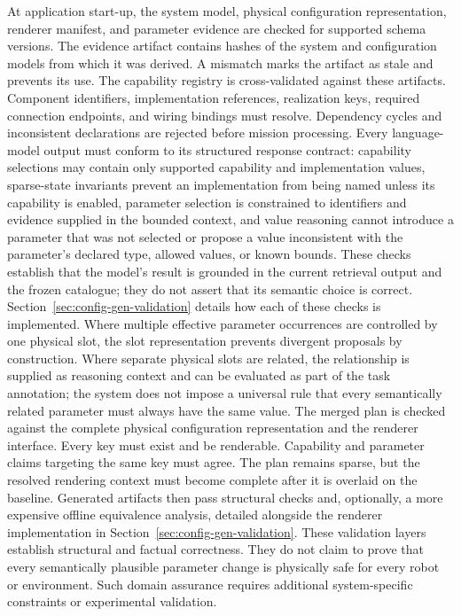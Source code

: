At application start-up, the system model, physical configuration representation, renderer manifest, and parameter evidence are checked for supported schema versions. The evidence artifact contains hashes of the system and configuration models from which it was derived. A mismatch marks the artifact as stale and prevents its use.
The capability registry is cross-validated against these artifacts. Component identifiers, implementation references, realization keys, required connection endpoints, and wiring bindings must resolve. Dependency cycles and inconsistent declarations are rejected before mission processing.
Every language-model output must conform to its structured response contract: capability selections may contain only supported capability and implementation values, sparse-state invariants prevent an implementation from being named unless its capability is enabled, parameter selection is constrained to identifiers and evidence supplied in the bounded context, and value reasoning cannot introduce a parameter that was not selected or propose a value inconsistent with the parameter's declared type, allowed values, or known bounds. These checks establish that the model's result is grounded in the current retrieval output and the frozen catalogue; they do not assert that its semantic choice is correct. Section~\ref{sec:config-gen-validation} details how each of these checks is implemented.
Where multiple effective parameter occurrences are controlled by one physical slot, the slot representation prevents divergent proposals by construction. Where separate physical slots are related, the relationship is supplied as reasoning context and can be evaluated as part of the task annotation; the system does not impose a universal rule that every semantically related parameter must always have the same value.
The merged plan is checked against the complete physical configuration representation and the renderer interface. Every key must exist and be renderable. Capability and parameter claims targeting the same key must agree. The plan remains sparse, but the resolved rendering context must become complete after it is overlaid on the baseline. Generated artifacts then pass structural checks and, optionally, a more expensive offline equivalence analysis, detailed alongside the renderer implementation in Section~\ref{sec:config-gen-validation}.
These validation layers establish structural and factual correctness. They do not claim to prove that every semantically plausible parameter change is physically safe for every robot or environment. Such domain assurance requires additional system-specific constraints or experimental validation.

